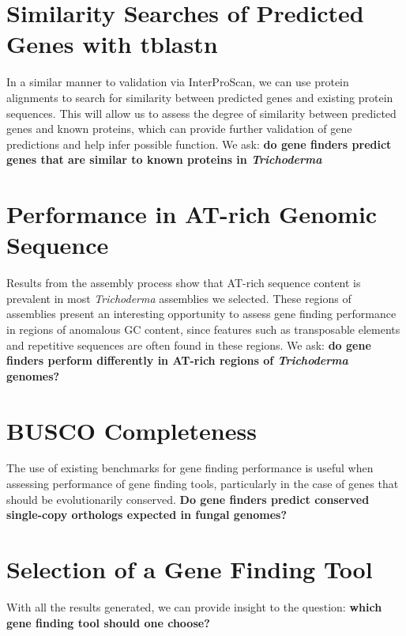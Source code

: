 \section{Similarity Searches of Predicted Genes with tblastn}
\label{rq:tblastn}
In a similar manner to validation via InterProScan, we can use protein alignments to search for similarity between predicted genes and existing protein sequences. This will allow us to assess the degree of similarity between predicted genes and known proteins, which can provide further validation of gene predictions and help infer possible function. We ask: \textbf{do gene finders predict genes that are similar to known proteins in \textit{Trichoderma}}


\section{Performance in AT-rich Genomic Sequence}
\label{rq:anomalous-sequence-content}
Results from the assembly process show that AT-rich sequence content is prevalent in most \textit{Trichoderma} assemblies we selected. These regions of assemblies present an interesting opportunity to assess gene finding performance
in regions of anomalous GC content, since features such as transposable elements and repetitive sequences are often found in these regions. We ask: \textbf{do gene finders perform differently in AT-rich regions of \textit{Trichoderma} genomes?}   

\section{BUSCO Completeness}
\label{rq:busco-completeness}
The use of existing benchmarks for gene finding performance is useful
when assessing performance of gene finding tools, particularly in the
case of genes that should be evolutionarily conserved. \textbf{Do gene
  finders predict conserved single-copy orthologs expected in fungal
  genomes?}

\section{Selection of a Gene Finding Tool}

With all the results generated, we can provide insight to the
question: \textbf{which gene finding tool should one choose?}
